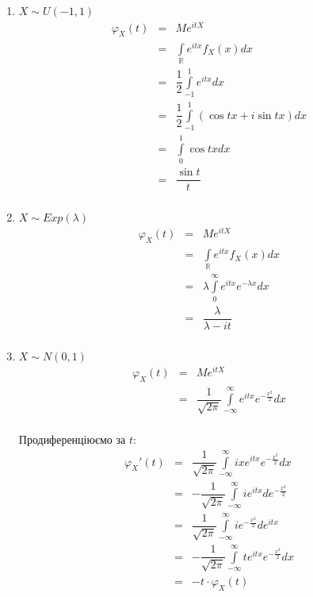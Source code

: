 \begin{example}
\begin{enumerate}
    \item $X \sim U(-1, 1)$
        $$\begin{array}{rcl}
            \varphi_X(t) & = & M e^{itX} \\
            & = & \int\limits_{\mathbb{R}} e^{itx} f_X(x) dx \\
            & = & \dfrac{1}{2} \int\limits_{-1}^{1} e^{itx} dx \\
            & = & \dfrac{1}{2} \int\limits_{-1}^{1} (\cos tx + i\sin tx) dx \\
            & = & \int\limits_{0}^{1} \cos tx dx \\
            & = & \dfrac{\sin t}{t} \\
        \end{array}$$

    \item $X \sim Exp(\lambda)$
        $$\begin{array}{rcl}
            \varphi_X(t) & = & M e^{itX} \\
            & = & \int\limits_{\mathbb{R}} e^{itx} f_X(x) dx \\
            & = & \lambda \int\limits_{0}^{\infty} e^{itx} e^{-\lambda x} dx \\
            & = & \dfrac{\lambda}{\lambda - it} \\
        \end{array}$$

    \item $X \sim N(0, 1)$
        $$\begin{array}{rcl}
            \varphi_X(t) & = & M e^{itX} \\
            & = & \dfrac{1}{\sqrt{2 \pi}} \int\limits_{-\infty}^{\infty} e^{itx} e^{-\frac{x^2}{2}} dx \\
        \end{array}$$
        
        Продиференціюємо за $t$:
        $$\begin{array}{rcl}
            \varphi_X'(t) & = & \dfrac{1}{\sqrt{2 \pi}} \int\limits_{-\infty}^{\infty} ix e^{itx} e^{-\frac{x^2}{2}} dx \\
            & = & - \dfrac{1}{\sqrt{2 \pi}} \int\limits_{-\infty}^{\infty} i e^{itx} de^{-\frac{x^2}{2}} \\
            & = & \dfrac{1}{\sqrt{2 \pi}} \int\limits_{-\infty}^{\infty} i e^{-\frac{x^2}{2}} de^{itx} \\
            & = & -\dfrac{1}{\sqrt{2 \pi}} \int\limits_{-\infty}^{\infty} t e^{itx} e^{-\frac{x^2}{2}} dx \\
            & = & - t \cdot \varphi_X(t) \\
        \end{array}$$


\end{enumerate}
\end{example}
